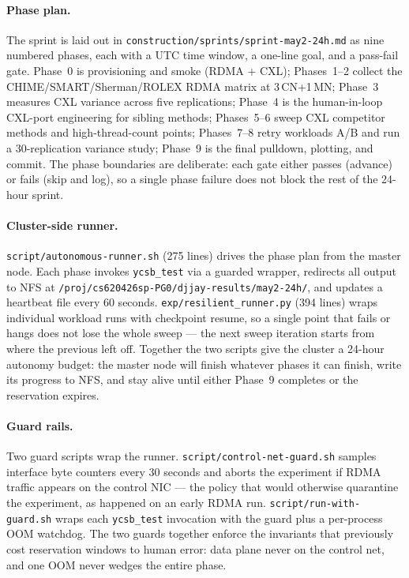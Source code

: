 \documentclass[11pt,a4paper]{article}
\begin{document}
\paragraph{Phase plan.} The sprint is laid out in \texttt{construction/sprints/sprint-may2-24h.md} as nine numbered phases, each with a UTC time window, a one-line goal, and a pass-fail gate. Phase~0 is provisioning and smoke (RDMA + CXL); Phases~1--2 collect the CHIME/SMART/Sherman/ROLEX RDMA matrix at 3\,CN+1\,MN; Phase~3 measures CXL variance across five replications; Phase~4 is the human-in-loop CXL-port engineering for sibling methods; Phases~5--6 sweep CXL competitor methods and high-thread-count points; Phases~7--8 retry workloads A/B and run a 30-replication variance study; Phase~9 is the final pulldown, plotting, and commit. The phase boundaries are deliberate: each gate either passes (advance) or fails (skip and log), so a single phase failure does not block the rest of the 24-hour sprint.

\paragraph{Cluster-side runner.} \texttt{script/autonomous-runner.sh} (275 lines) drives the phase plan from the master node. Each phase invokes \texttt{ycsb\_test} via a guarded wrapper, redirects all output to NFS at \texttt{/proj/cs620426sp-PG0/djjay-results/may2-24h/}, and updates a heartbeat file every 60 seconds. \texttt{exp/resilient\_runner.py} (394 lines) wraps individual workload runs with checkpoint resume, so a single point that fails or hangs does not lose the whole sweep --- the next sweep iteration starts from where the previous left off. Together the two scripts give the cluster a 24-hour autonomy budget: the master node will finish whatever phases it can finish, write its progress to NFS, and stay alive until either Phase~9 completes or the reservation expires.

\paragraph{Guard rails.} Two guard scripts wrap the runner. \texttt{script/control-net-guard.sh} samples interface byte counters every 30 seconds and aborts the experiment if RDMA traffic appears on the control NIC --- the policy that would otherwise quarantine the experiment, as happened on an early RDMA run. \texttt{script/run-with-guard.sh} wraps each \texttt{ycsb\_test} invocation with the guard plus a per-process OOM watchdog. The two guards together enforce the invariants that previously cost reservation windows to human error: data plane never on the control net, and one OOM never wedges the entire phase.
\end{document}
